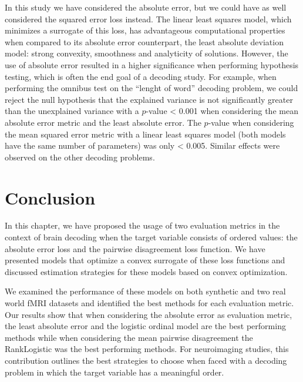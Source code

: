 In this study we have considered the absolute error, but we could have as well considered the squared error loss instead. The linear least squares model, which minimizes a surrogate of this loss, has advantageous computational properties when compared to its absolute error counterpart, the least absolute deviation model: strong convexity, smoothness and analyticity of solutions. However, the use of absolute error resulted in a higher significance when performing hypothesis testing, which is often the end goal of a decoding study. For example, when performing the omnibus test on the ``lenght of word'' decoding problem, we could reject the null hypothesis that the explained variance is not significantly greater than the unexplained variance with a $p$-value < 0.001 when considering the mean absolute error metric and the least absolute error. The $p$-value when considering the mean squared error metric with a linear least squares model (both models have the same number of parameters) was only < 0.005. Similar effects were observed on the other decoding problems.





%



%
\section{Conclusion}
%

In this chapter, we have proposed the usage of two evaluation metrics in the context of brain decoding when the target variable consists of ordered values: the absolute error loss and the pairwise disagreement loss function. We have presented models that optimize a convex surrogate of these loss functions and discussed estimation strategies for these models based on convex optimization. 

We examined the performance of these models on both synthetic and two real world fMRI datasets and identified the best methods for each evaluation metric. Our results show that when considering the absolute error as evaluation metric, the least absolute error and the logistic ordinal model are the best performing methods while when considering the mean pairwise disagreement the RankLogistic was the best performing methods.
For neuroimaging studies, this contribution outlines the best strategies to choose when faced with a decoding problem in which the target variable has a meaningful order.


%
%

\newpage

\begin{fullwidth}


\end{fullwidth}
